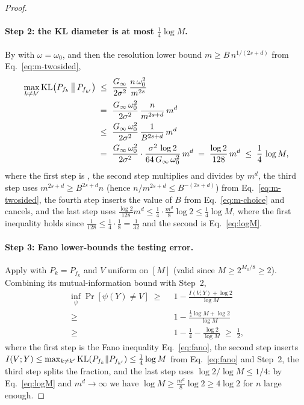 \begin{proof}
\paragraph{Step 2: the KL diameter is at most $\tfrac14\log M$.}
By  with $\omega=\omega_0$, and then the resolution lower bound
$m\ge B\,n^{1/(2s+d)}$ from Eq.~\eqref{eq:m-twosided},
\begin{align*}
\max_{k\ne k'}\mathrm{KL}\!\left(P_{f_k}\,\middle\|\,P_{f_{k'}}\right)
\;\le\; & ~ \frac{G_\infty}{2\sigma^2}\,\frac{n\,\omega_0^2}{m^{2s}} \\
\;=\; & ~ \frac{G_\infty\,\omega_0^2}{2\sigma^2}\,\frac{n}{m^{2s+d}}\,m^{d} \\
\;\le\; & ~ \frac{G_\infty\,\omega_0^2}{2\sigma^2}\,\frac{1}{B^{2s+d}}\,m^{d} \\
\;=\; & ~ \frac{G_\infty\,\omega_0^2}{2\sigma^2}\cdot\frac{\sigma^2\,\log 2}{64\,G_\infty\,\omega_0^2}\,m^{d}
\;=\; \frac{\log 2}{128}\,m^{d}
\;\le\; \frac14\,\log M,
\end{align*}
where the first step is , the second step multiplies and divides
by $m^{d}$, the third step uses $m^{2s+d}\ge B^{2s+d}n$ (hence
$n/m^{2s+d}\le B^{-(2s+d)}$) from Eq.~\eqref{eq:m-twosided}, the fourth step
inserts the value of $B$ from Eq.~\eqref{eq:m-choice} and cancels, and the last
step uses
$\tfrac{\log2}{128}m^d\le\tfrac14\cdot\tfrac{m^d}{8}\log2\le\tfrac14\log M$,
where the first inequality holds since $\tfrac{1}{128}\le\tfrac14\cdot\tfrac18=\tfrac{1}{32}$
and the second is Eq.~\eqref{eq:logM}.

\paragraph{Step 3: Fano lower-bounds the testing error.}
Apply  with $P_k=P_{f_k}$ and $V$ uniform on $[M]$ (valid since
$M\ge 2^{M_0/8}\ge 2$). Combining its mutual-information bound with Step~2,
\begin{align*}
\inf_{\psi}\Pr\!\left[\psi(Y)\ne V\right]
\;\ge\; & ~ 1 - \frac{I(V;Y)+\log 2}{\log M} \\
\;\ge\; & ~ 1 - \frac{\tfrac14\log M+\log 2}{\log M} \\
\;\ge\; & ~ 1 - \frac14 - \frac{\log 2}{\log M}
\;\ge\; \frac12,
\end{align*}
where the first step is the Fano inequality Eq.~\eqref{eq:fano}, the second step
inserts $I(V;Y)\le\max_{k\ne k'}\mathrm{KL}(P_{f_k}\|P_{f_{k'}})\le\tfrac14\log M$ from
Eq.~\eqref{eq:fano} and Step~2, the third step splits the fraction, and the last
step uses $\log 2/\log M\le 1/4$: by Eq.~\eqref{eq:logM} and
$m^d\to\infty$ we have $\log M\ge\tfrac{m^d}{8}\log 2\ge 4\log 2$ for $n$ large
enough.


\end{proof}
